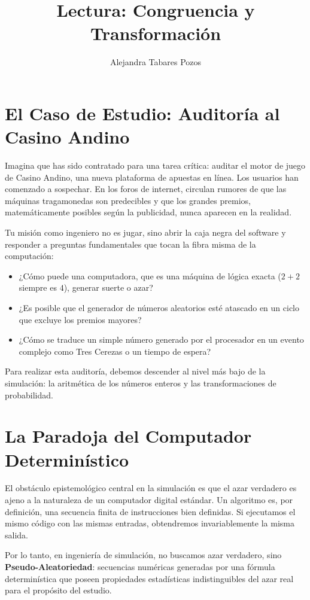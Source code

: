 \documentclass[11pt, letterpaper]{article}
\title{Lectura: Congruencia y Transformación}
\author{Alejandra Tabares Pozos}
\date{}
\begin{document}
\maketitle
\tableofcontents
\newpage


\section{El Caso de Estudio: Auditoría al Casino Andino}

Imagina que has sido contratado para una tarea crítica: auditar el motor de juego de Casino Andino, una nueva plataforma de apuestas en línea. Los usuarios han comenzado a sospechar. En los foros de internet, circulan rumores de que las máquinas tragamonedas son predecibles y que los grandes premios, matemáticamente posibles según la publicidad, nunca aparecen en la realidad.

Tu misión como ingeniero no es jugar, sino abrir la caja negra del software y responder a preguntas fundamentales que tocan la fibra misma de la computación:
\begin{itemize}
    \item ¿Cómo puede una computadora, que es una máquina de lógica exacta ($2+2$ siempre es $4$), generar suerte o azar?
    \item ¿Es posible que el generador de números aleatorios esté atascado en un ciclo que excluye los premios mayores?
    \item ¿Cómo se traduce un simple número generado por el procesador en un evento complejo como Tres Cerezas o un tiempo de espera?
\end{itemize}

Para realizar esta auditoría, debemos descender al nivel más bajo de la simulación: la aritmética de los números enteros y las transformaciones de probabilidad.

\section{La Paradoja del Computador Determinístico}

El obstáculo epistemológico central en la simulación es que el azar verdadero es ajeno a la naturaleza de un computador digital estándar. Un algoritmo es, por definición, una secuencia finita de instrucciones bien definidas. Si ejecutamos el mismo código con las mismas entradas, obtendremos invariablemente la misma salida.

Por lo tanto, en ingeniería de simulación, no buscamos azar verdadero, sino \textbf{Pseudo-Aleatoriedad}: secuencias numéricas generadas por una fórmula determinística que poseen propiedades estadísticas indistinguibles del azar real para el propósito del estudio.
\end{document}

